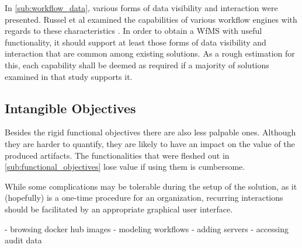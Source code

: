         In \ref{sub:workflow_data}, various forms of data visibility and interaction were presented. Russel et al examined the capabilities of various workflow engines with regards to these characteristics \cite{Russell2005Workflow}. In order to obtain a \ac{WfMS} with useful functionality, it should support at least those forms of data visibility and interaction that are common among existing solutions. As a rough estimation for this, each capability shall be deemed as required if a majority of solutions examined in that study supports it.


\subsection{Intangible Objectives} %
  \label{sub:intangible_objectives}

  Besides the rigid functional objectives there are also less palpable ones. Although they are harder to quantify, they are likely to have an impact on the value of the produced artifacts. The functionalities that were fleshed out in \ref{sub:functional_objectives} lose value if using them is cumbersome.

  While some complications may be tolerable during the setup of the solution, as it (hopefully) is a one-time procedure for an organization, recurring interactions should be facilitated by an appropriate graphical user interface.

  - browsing docker hub images
  - modeling workflows
  - adding servers
  - accessing audit data

